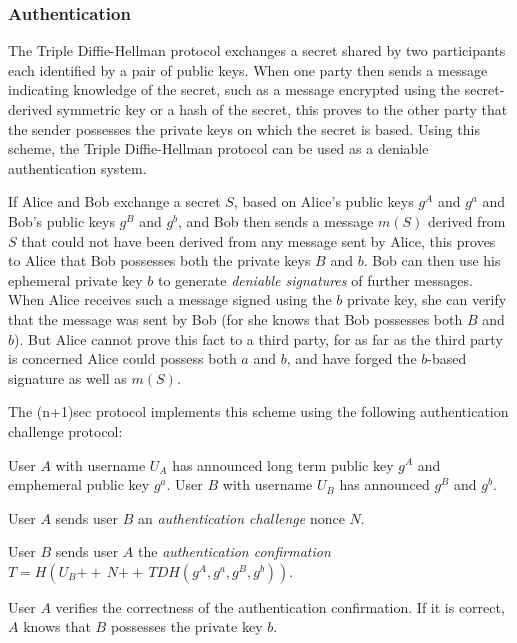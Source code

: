 \documentclass{article}
\def\concat{\mathbin{+\!\!\!+\,}}
\begin{document}

\subsubsection{Authentication}
\label{sec:cryptography/triple-diffie-hellman/authentication}

The Triple Diffie-Hellman protocol exchanges a secret shared by two participants each identified by a pair of public keys.
When one party then sends a message indicating knowledge of the secret, such as a message encrypted using the secret-derived symmetric key or a hash of the secret, this proves to the other party that the sender possesses the private keys on which the secret is based.
Using this scheme, the Triple Diffie-Hellman protocol can be used as a deniable authentication system.

If Alice and Bob exchange a secret $S$, based on Alice's public keys $g^A$ and $g^a$ and Bob's public keys $g^B$ and $g^b$, and Bob then sends a message $m(S)$ derived from $S$ that could not have been derived from any message sent by Alice, this proves to Alice that Bob possesses both the private keys $B$ and $b$.
Bob can then use his ephemeral private key $b$ to generate \emph{deniable signatures} of further messages.
When Alice receives such a message signed using the $b$ private key, she can verify that the message was sent by Bob (for she knows that Bob possesses both $B$ and $b$).
But Alice cannot prove this fact to a third party, for as far as the third party is concerned Alice could possess both $a$ and $b$, and have forged the $b$-based signature as well as $m(S)$.

The (n+1)sec protocol implements this scheme using the following authentication challenge protocol:
\begin{description}[noitemsep]
\item[Participants.] User $A$ with username $U_A$ has announced long term public key $g^A$ and emphemeral public key $g^a$. User $B$ with username $U_B$ has announced $g^B$ and $g^b$.
\item[Round 1.] User $A$ sends user $B$ an \emph{authentication challenge} nonce $N$.
\item[Round 2.] User $B$ sends user $A$ the \emph{authentication confirmation} $T = H(U_B \concat N \concat TDH(g^A, g^a, g^B, g^b))$.
\item[Computation.] User $A$ verifies the correctness of the authentication confirmation. If it is correct, $A$ knows that $B$ possesses the private key $b$.
\end{description}
\end{document}
